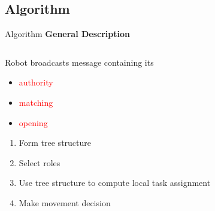 \documentclass[10pt]{beamer}
\begin{document}
\subsection[Algorithm]{Algorithm}
\begin{frame}{Algorithm}
  \textbf{General Description}
  \begin{columns}[T] %
   \begin{column}{.45\textwidth}
     Robot broadcasts message containing its
     \begin{itemize}
     \item \textcolor{red}{authority} 
     \item \textcolor{red}{matching}
     \item \textcolor{red}{opening}
     \end{itemize}

     \begin{enumerate}
     \item Form tree structure
     \item Select roles
     \item Use tree structure to compute local task assignment
     \item Make movement decision
     \end{enumerate}
    \end{column}%
    \begin{column}{.45\textwidth}
      
    \end{column}%
  \end{columns}
\end{frame}
\end{document}
